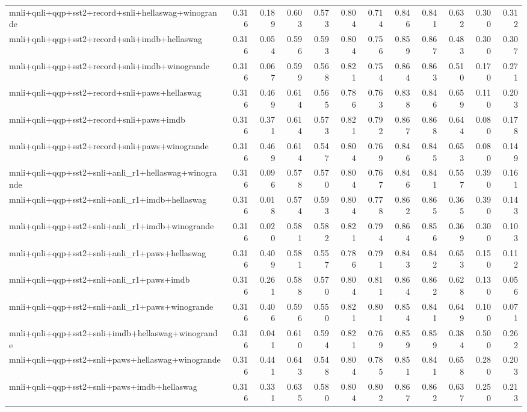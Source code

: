 \begin{table}[t]
\begin{tabular}{lrrrrrrrrrrr}
    mnli+qnli+qqp+sst2+record+snli+hellaswag+winogrande & 0.316 & 0.189 & 0.603 & 0.573 & 0.804 & 0.714 & 0.846 & 0.841 & 0.632 & 0.300 & 0.312 \\
    mnli+qnli+qqp+sst2+record+snli+imdb+hellaswag & 0.316 & 0.054 & 0.596 & 0.593 & 0.804 & 0.756 & 0.859 & 0.867 & 0.483 & 0.300 & 0.307 \\
    mnli+qnli+qqp+sst2+record+snli+imdb+winogrande & 0.316 & 0.067 & 0.599 & 0.568 & 0.821 & 0.754 & 0.864 & 0.863 & 0.510 & 0.170 & 0.271 \\
    mnli+qnli+qqp+sst2+record+snli+paws+hellaswag & 0.316 & 0.469 & 0.614 & 0.565 & 0.786 & 0.763 & 0.838 & 0.846 & 0.659 & 0.110 & 0.203 \\
    mnli+qnli+qqp+sst2+record+snli+paws+imdb & 0.316 & 0.371 & 0.614 & 0.573 & 0.821 & 0.792 & 0.867 & 0.868 & 0.644 & 0.080 & 0.178 \\
    mnli+qnli+qqp+sst2+record+snli+paws+winogrande & 0.316 & 0.469 & 0.614 & 0.547 & 0.804 & 0.769 & 0.846 & 0.845 & 0.653 & 0.080 & 0.149 \\
    mnli+qnli+qqp+sst2+snli+anli\_r1+hellaswag+winogrande & 0.316 & 0.096 & 0.578 & 0.570 & 0.804 & 0.767 & 0.846 & 0.841 & 0.557 & 0.390 & 0.161 \\
    mnli+qnli+qqp+sst2+snli+anli\_r1+imdb+hellaswag & 0.316 & 0.018 & 0.574 & 0.593 & 0.804 & 0.778 & 0.862 & 0.865 & 0.365 & 0.390 & 0.143 \\
    mnli+qnli+qqp+sst2+snli+anli\_r1+imdb+winogrande & 0.316 & 0.020 & 0.581 & 0.582 & 0.821 & 0.794 & 0.864 & 0.856 & 0.369 & 0.300 & 0.103 \\
    mnli+qnli+qqp+sst2+snli+anli\_r1+paws+hellaswag & 0.316 & 0.409 & 0.581 & 0.557 & 0.786 & 0.791 & 0.843 & 0.842 & 0.653 & 0.150 & 0.112 \\
    mnli+qnli+qqp+sst2+snli+anli\_r1+paws+imdb & 0.316 & 0.261 & 0.588 & 0.570 & 0.804 & 0.811 & 0.864 & 0.862 & 0.628 & 0.130 & 0.056 \\
    mnli+qnli+qqp+sst2+snli+anli\_r1+paws+winogrande & 0.316 & 0.406 & 0.596 & 0.550 & 0.821 & 0.801 & 0.854 & 0.841 & 0.649 & 0.100 & 0.071 \\
    mnli+qnli+qqp+sst2+snli+imdb+hellaswag+winogrande & 0.316 & 0.041 & 0.610 & 0.594 & 0.821 & 0.769 & 0.859 & 0.859 & 0.384 & 0.500 & 0.262 \\
    mnli+qnli+qqp+sst2+snli+paws+hellaswag+winogrande & 0.316 & 0.441 & 0.643 & 0.548 & 0.804 & 0.785 & 0.851 & 0.841 & 0.658 & 0.280 & 0.203 \\
    mnli+qnli+qqp+sst2+snli+paws+imdb+hellaswag & 0.316 & 0.331 & 0.635 & 0.580 & 0.804 & 0.802 & 0.867 & 0.862 & 0.637 & 0.250 & 0.213 \\

\end{tabular}
\end{table}
